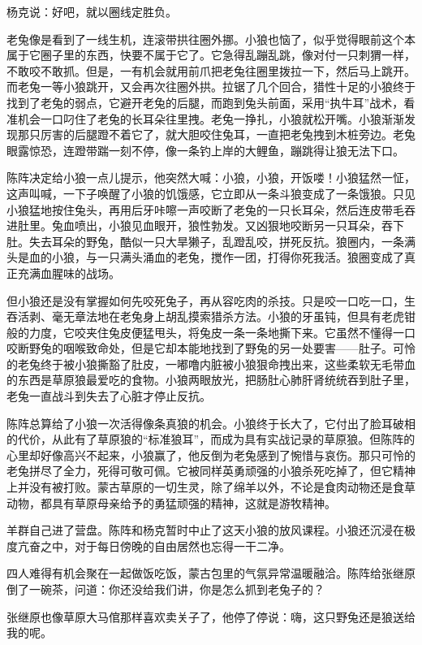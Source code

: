 \par 杨克说：好吧，就以圈线定胜负。
\par 老兔像是看到了一线生机，连滚带拱往圈外挪。小狼也恼了，似乎觉得眼前这个本属于它圈子里的东西，快要不属于它了。它急得乱蹦乱跳，像对付一只刺猬一样，不敢咬不敢抓。但是，一有机会就用前爪把老兔往圈里拨拉一下，然后马上跳开。而老兔一等小狼跳开，又会再次往圈外拱。拉锯了几个回合，猎性十足的小狼终于找到了老兔的弱点，它避开老兔的后腿，而跑到兔头前面，采用“执牛耳”战术，看准机会一口叼住了老兔的长耳朵往里拽。老兔一挣扎，小狼就松开嘴。小狼渐渐发现那只厉害的后腿蹬不着它了，就大胆咬住兔耳，一直把老兔拽到木桩旁边。老兔眼露惊恐，连蹬带踹一刻不停，像一条钓上岸的大鲤鱼，蹦跳得让狼无法下口。
\par 陈阵决定给小狼一点儿提示，他突然大喊：小狼，小狼，开饭喽！小狼猛然一怔，这声叫喊，一下子唤醒了小狼的饥饿感，它立即从一条斗狼变成了一条饿狼。只见小狼猛地按住兔头，再用后牙咔嚓一声咬断了老兔的一只长耳朵，然后连皮带毛吞进肚里。兔血喷出，小狼见血眼开，狼性勃发。又凶狠地咬断另一只耳朵，吞下肚。失去耳朵的野兔，酷似一只大旱獭子，乱蹬乱咬，拼死反抗。狼圈内，一条满头是血的小狼，与一只满头涌血的老兔，搅作一团，打得你死我活。狼圈变成了真正充满血腥味的战场。
\par 但小狼还是没有掌握如何先咬死兔子，再从容吃肉的杀技。只是咬一口吃一口，生吞活剥、毫无章法地在老兔身上胡乱摸索猎杀方法。小狼的牙虽钝，但具有老虎钳般的力度，它咬夹住兔皮便猛甩头，将兔皮一条一条地撕下来。它虽然不懂得一口咬断野兔的咽喉致命处，但是它却本能地找到了野兔的另一处要害——肚子。可怜的老兔终于被小狼撕豁了肚皮，一嘟噜内脏被小狼狠命拽出来，这些柔软无毛带血的东西是草原狼最爱吃的食物。小狼两眼放光，把肠肚心肺肝肾统统吞到肚子里，老兔一直战斗到失去了心脏才停止反抗。
\par 陈阵总算给了小狼一次活得像条真狼的机会。小狼终于长大了，它付出了脸耳破相的代价，从此有了草原狼的“标准狼耳”，而成为具有实战记录的草原狼。但陈阵的心里却好像高兴不起来，小狼赢了，他反倒为老兔感到了惋惜与哀伤。那只可怜的老兔拼尽了全力，死得可敬可佩。它被同样英勇顽强的小狼杀死吃掉了，但它精神上并没有被打败。蒙古草原的一切生灵，除了绵羊以外，不论是食肉动物还是食草动物，都具有草原母亲给予的勇猛顽强的精神，这就是游牧精神。
\par 羊群自己进了营盘。陈阵和杨克暂时中止了这天小狼的放风课程。小狼还沉浸在极度亢奋之中，对于每日傍晚的自由居然也忘得一干二净。
\par 
\par 四人难得有机会聚在一起做饭吃饭，蒙古包里的气氛异常温暖融洽。陈阵给张继原倒了一碗茶，问道：你还没给我们讲，你是怎么抓到老兔子的？
\par 张继原也像草原大马倌那样喜欢卖关子了，他停了停说：嗨，这只野兔还是狼送给我的呢。
